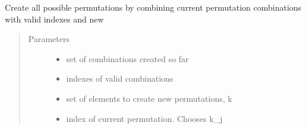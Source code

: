 \documentclass[letterpaper,10pt,english]{sphinxmanual}
\begin{document}

\begin{fulllineitems}
\label{\detokenize{functions:functions.permutations_create}}
Create all possible permutations by combining current permutation combinations with valid indexes and new
\begin{quote}\begin{description}
\item[{Parameters}] \leavevmode\begin{itemize}
\item {} 
 \textendash{} set of combinations created so far

\item {} 
 \textendash{} indexes of valid combinations

\item {} 
 \textendash{} set of elements to create new permutations, k

\item {} 
 \textendash{} index of current permutation. Chooses k\_j

\end{itemize}

\end{description}\end{quote}

\end{fulllineitems}

\end{document}
